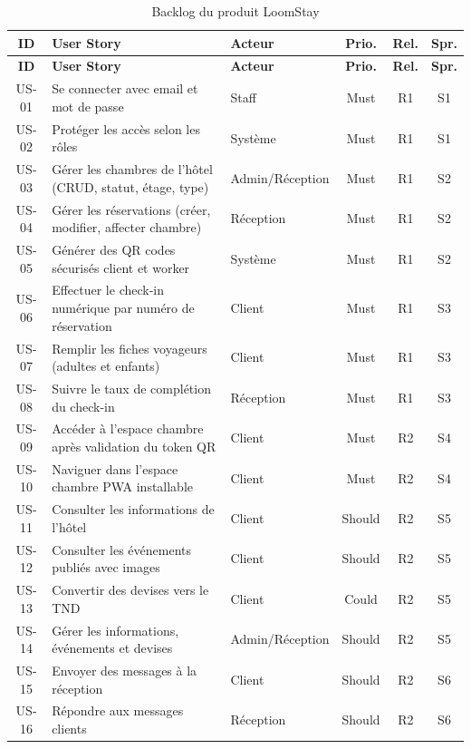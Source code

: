 \begin{longtable}{|c|p{7.8cm}|p{2.4cm}|c|c|c|}
\caption{Backlog du produit LoomStay} \label{tab:backlog_produit} \\
\hline
\textbf{ID} & \textbf{User Story} & \textbf{Acteur} & \textbf{Prio.} & \textbf{Rel.} & \textbf{Spr.} \\
\hline
\endfirsthead
\hline
\textbf{ID} & \textbf{User Story} & \textbf{Acteur} & \textbf{Prio.} & \textbf{Rel.} & \textbf{Spr.} \\
\hline
\endhead
US-01 & Se connecter avec email et mot de passe & Staff & Must & R1 & S1 \\ \hline
US-02 & Protéger les accès selon les rôles & Système & Must & R1 & S1 \\ \hline
US-03 & Gérer les chambres de l'hôtel (CRUD, statut, étage, type) & Admin/Réception & Must & R1 & S2 \\ \hline
US-04 & Gérer les réservations (créer, modifier, affecter chambre) & Réception & Must & R1 & S2 \\ \hline
US-05 & Générer des QR codes sécurisés client et worker & Système & Must & R1 & S2 \\ \hline
US-06 & Effectuer le check-in numérique par numéro de réservation & Client & Must & R1 & S3 \\ \hline
US-07 & Remplir les fiches voyageurs (adultes et enfants) & Client & Must & R1 & S3 \\ \hline
US-08 & Suivre le taux de complétion du check-in & Réception & Must & R1 & S3 \\ \hline
US-09 & Accéder à l'espace chambre après validation du token QR & Client & Must & R2 & S4 \\ \hline
US-10 & Naviguer dans l'espace chambre PWA installable & Client & Must & R2 & S4 \\ \hline
US-11 & Consulter les informations de l'hôtel & Client & Should & R2 & S5 \\ \hline
US-12 & Consulter les événements publiés avec images & Client & Should & R2 & S5 \\ \hline
US-13 & Convertir des devises vers le TND & Client & Could & R2 & S5 \\ \hline
US-14 & Gérer les informations, événements et devises & Admin/Réception & Should & R2 & S5 \\ \hline
US-15 & Envoyer des messages à la réception & Client & Should & R2 & S6 \\ \hline
US-16 & Répondre aux messages clients & Réception & Should & R2 & S6 \\ \hline

\end{longtable}
